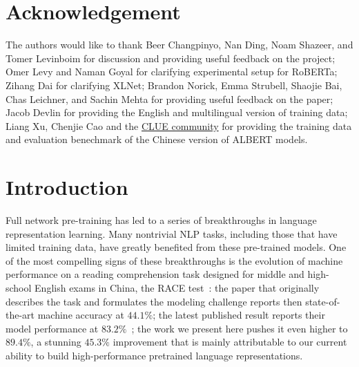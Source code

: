 \section*{Acknowledgement}
The authors would like to thank Beer Changpinyo, Nan Ding, Noam Shazeer, and Tomer Levinboim for discussion and providing useful feedback on the project; Omer Levy and Naman Goyal for clarifying experimental setup for RoBERTa;  Zihang Dai for clarifying XLNet; Brandon Norick, Emma Strubell, Shaojie Bai, Chas Leichner, and Sachin Mehta for providing useful feedback on the paper; Jacob Devlin for providing the English and multilingual version of training data; Liang Xu, Chenjie Cao and the \href{https://github.com/CLUEbenchmark/CLUE}{CLUE community} for providing the training data and evaluation benechmark of the Chinese version of ALBERT models. 



\appendix







\section{Introduction}
Full network pre-training \citep{dai2015semi,radford2018improving, devlin2018bert,howard2018universal} has led to a series of breakthroughs in language representation learning. Many nontrivial NLP tasks, including those that have limited training data, have greatly benefited from these pre-trained models. One of the most compelling signs of these breakthroughs is the evolution of machine performance on a reading comprehension task designed for middle and high-school English exams in China, the RACE test~\citep{lai2017race}: the paper that originally describes the task and formulates the modeling challenge reports then state-of-the-art machine accuracy at $44.1\%$; the latest published result reports their model performance at $83.2\%$~\citep{liu2019roberta}; the work we present here pushes it even higher to $89.4\%$, a stunning $45.3\%$ improvement that is mainly attributable to our current ability to build high-performance pretrained language representations.




